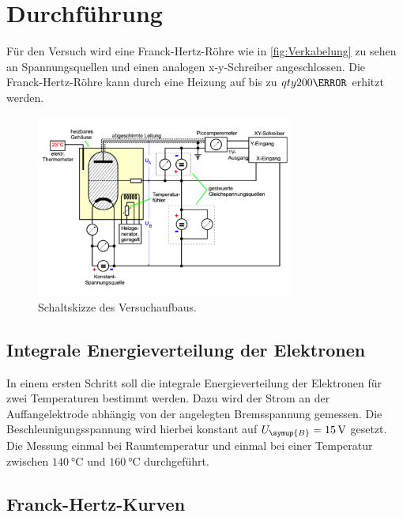 \section{Durchführung}
\label{sec:Durchführung}
Für den Versuch wird eine Franck-Hertz-Röhre wie in \autoref{fig:Verkabelung} zu sehen an Spannungsquellen und einen analogen 
x-y-Schreiber angeschlossen. Die Franck-Hertz-Röhre kann durch eine Heizung auf bis zu $qty{200}{\celsius}$ erhitzt werden.
\begin{figure}[H]
    \centering
    \includegraphics[height=6cm]{content/pics/Verkabelung.pdf}
    \caption{Schaltskizze des Versuchaufbaus.\cite{v601}}
    \label{fig:Verkabelung}
\end{figure}

\subsection{Integrale Energieverteilung der Elektronen}
\label{sec:Engergieverteilung Elektronen}
In einem ersten Schritt soll die integrale Energieverteilung der Elektronen für zwei Temperaturen bestimmt werden. Dazu wird der Strom 
an der Auffangelektrode abhängig von der angelegten Bremsspannung gemessen. Die Beschleunigungsspannung wird hierbei konstant auf 
$U_{\symup{B}}=\qty{15}{\volt}$ gesetzt. Die Messung einmal bei Raumtemperatur und einmal bei einer Temperatur zwischen 
$\qty{140}{\celsius}$ und $\qty{160}{\celsius}$ durchgeführt.

\subsection{Franck-Hertz-Kurven}
\label{sec:Franck-Hertz-Kurven}